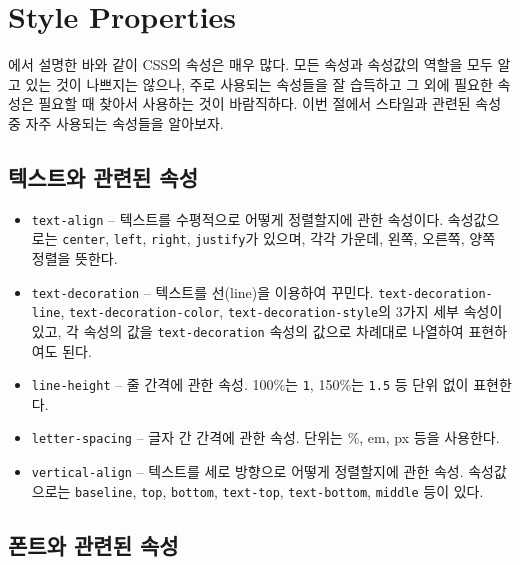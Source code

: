 \section{Style Properties} \label{sect:style-properties}

에서 설명한 바와 같이 CSS의 속성은 매우 많다. 모든 속성과 속성값의 역할을 모두 알고 있는 것이 나쁘지는 않으나, 주로 사용되는 속성들을 잘 습득하고 그 외에 필요한 속성은 필요할 때 찾아서 사용하는 것이 바람직하다. 이번 절에서 스타일과 관련된 속성 중 자주 사용되는 속성들을 알아보자.

\subsection*{텍스트와 관련된 속성}

\begin{itemize}
    \item \texttt{text-align} – 텍스트를 수평적으로 어떻게 정렬할지에 관한 속성이다. 속성값으로는 \texttt{center}, \texttt{left}, \texttt{right}, \texttt{justify}가 있으며, 각각 가운데, 왼쪽, 오른쪽, 양쪽 정렬을 뜻한다.
    \item \texttt{text-decoration} – 텍스트를 선(line)을 이용하여 꾸민다. \texttt{text-decoration-line}, \texttt{text-decoration-color}, \texttt{text-decoration-style}의 3가지 세부 속성이 있고, 각 속성의 값을 \texttt{text-decoration} 속성의 값으로 차례대로 나열하여 표현하여도 된다.	
    \item \texttt{line-height} – 줄 간격에 관한 속성. 100\%는 \texttt{1}, 150\%는 \texttt{1.5} 등 단위 없이 표현한다.
    \item \texttt{letter-spacing} – 글자 간 간격에 관한 속성. 단위는 \%, em, px 등을 사용한다. 
    \item \texttt{vertical-align} – 텍스트를 세로 방향으로 어떻게 정렬할지에 관한 속성. 속성값으로는 \texttt{baseline}, \texttt{top}, \texttt{bottom}, \texttt{text-top}, \texttt{text-bottom}, \texttt{middle} 등이 있다.
\end{itemize}

\subsection*{폰트와 관련된 속성}

